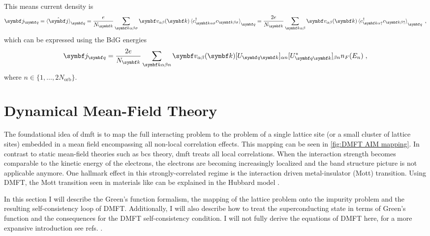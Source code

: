\documentclass[../main.tex]{subfiles}
\begin{document}
This means current density is
\begin{align}
	\vb{j}_{\vb{q}} = \braket{\ope{\vb{j}}}_{\vb{q}} = \frac{e}{N_{\vb{k}}} \sum_{\vb{k} \alpha \beta \sigma} \vb{v}_{\alpha \beta} (\vb{k}) \braket{c_{\vb{k} \alpha \sigma}^{\dagger} c_{\vb{k} \beta \sigma}}_{\vb{q}} = \frac{2 e}{N_{\vb{k}}} \sum_{\vb{k} \alpha \beta} \vb{v}_{\alpha \beta} (\vb{k}) \braket{c_{\vb{k} \alpha \uparrow}^{\dagger} c_{\vb{k} \beta \uparrow}}_{\vb{q}} \;,
\end{align}
which can be expressed using the BdG energies
\begin{align}
	\vb{j}_{\vb{q}} = \frac{2 e}{N_{\vb{k}}} \sum_{\vb{k} \alpha \beta n} \vb{v}_{\alpha \beta} (\vb{k}) [U_{\vb{q} \vb{k}}]_{\alpha n} [U_{\vb{q} \vb{k}}^*]_{\beta n} n_F (E_n) \;,
\end{align}
where \(n \in \{1, \ldots, 2 N_{\mathrm{orb}}\}\).

\section{Dynamical Mean-Field Theory}\label{sec:Dynamical Mean-Field Theory}

The foundational idea of \gls{dmft} is to map the full interacting problem to the problem of a single lattice site (or a small cluster of lattice sites) embedded in a mean field encompassing all non-local correlation effects.
This mapping can be seen in \cref{fig:DMFT AIM mapping}.
In contrast to static mean-field theories such as \gls{bcs} theory, \gls{dmft} treats all local correlations.
When the interaction strength becomes comparable to the kinetic energy of the electrons, the electrons are becoming increasingly localized and the band structure picture is not applicable anymore.
One hallmark effect in this strongly-correlated regime is the interaction driven metal-insulator (Mott) transition.
Using DMFT, the Mott transition seen in materials like  \cite{mcwhanMottTransitionCrDoped1969} can be explained in the Hubbard model \cite{rozenbergMottHubbardTransitionInfinite1994}.

In this section I will describe the Green's function formalism, the mapping of the lattice problem onto the impurity problem and the resulting self-consistency loop of DMFT.
Additionally, I will also describe how to treat the superconducting state in terms of Green's function and the consequences for the DMFT self-consistency condition.
I will not fully derive the equations of DMFT here, for a more expansive introduction see refs. \cite{pavariniDynamicalMeanfieldTheory2022, georgesDynamicalMeanfieldTheory1996, colemanIntroductionManyBodyPhysics2015, bruusManyBodyQuantumTheory2004}.
\end{document}
